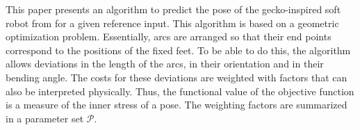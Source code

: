 \documentclass[letterpaper,10pt,conference]{ieeeconf}  %
\begin{document}
%
%
%




This paper presents an algorithm to predict the pose of the gecko-inspired soft robot from \cite{PA_SCHILLER} for a given reference input.
This algorithm is based on a geometric optimization problem.
Essentially, arcs are arranged so that their end points correspond to the positions of the fixed feet.
To be able to do this, the algorithm allows deviations in the length of the arcs, in their orientation and in their bending angle.
The costs for these deviations are weighted with factors that can also be interpreted physically.
Thus, the functional value of the objective function is a measure of the inner stress of a pose.
The weighting factors are summarized in a parameter set $\mathcal{P}$.
\end{document}
